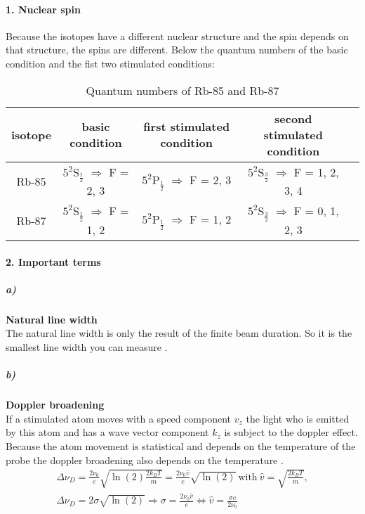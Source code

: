 \paragraph{1. Nuclear spin}
Because the isotopes have a different nuclear structure and the spin depends on that structure, the spins are different. Below the quantum numbers of the basic condition and the fist two stimulated conditions: 
\begin{table}[h]
    \centering
    \begin{tabular}{|c|c|c|c|c|}
        \hline
        isotope & basic condition & first stimulated condition & second stimulated condition \\
        \hline\hline
        Rb-85 & $5^2$S$_{\frac{1}{2}}$ $\Rightarrow$ F = 2, 3 & $5^2$P$_{\frac{1}{2}}$ $\Rightarrow$ F = 2, 3 & $5^2$S$_{\frac{3}{2}}$ $\Rightarrow$ F = 1, 2, 3, 4 \\
        \hline
        Rb-87 & $5^2$S$_{\frac{1}{2}}$ $\Rightarrow$ F = 1, 2 & $5^2$P$_{\frac{1}{2}}$ $\Rightarrow$ F = 1, 2 & $5^2$S$_{\frac{3}{2}}$ $\Rightarrow$ F = 0, 1, 2, 3 \\
        \hline
    \end{tabular}
    \caption{Quantum numbers of Rb-85 and Rb-87}
\end{table}
\paragraph{2. Important terms}

\subparagraph{a)}\textbf{Natural line width}\\
The natural line width is only the result of the finite beam duration. So it is the smallest line width you can measure \citep{Dem}.

\subparagraph{b)}\textbf{Doppler broadening}\\
If a stimulated atom moves with a speed component $v_z$ the light who is emitted by this atom and has a wave vector component $k_z$ is subject to the doppler effect. Because the atom movement is statistical and depends on the temperature of the probe the doppler broadening also depends on the temperature \citep{Dem}.
\begin{gather}
    \Delta \nu_D = \frac{2\nu_0}{c}\sqrt{\ln(2)\frac{2k_BT}{m}} = \frac{2\nu_0\hat{v}}{c}\sqrt{\ln(2)}~\text{with}~\hat{v}= \sqrt{\frac{2k_BT}{m}}, \\
    \Delta\nu_D = 2\sigma\sqrt{\ln(2)} \Rightarrow \sigma = \frac{2\nu_0\hat{v}}{c} \Leftrightarrow \hat{v} = \frac{\sigma c}{2 \nu_0}
\end{gather}

